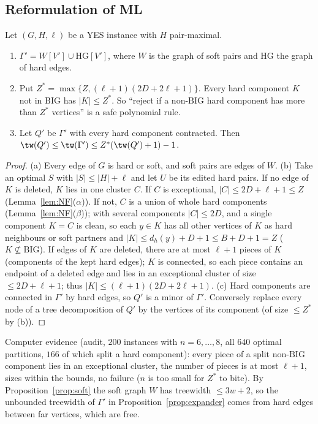 \subsection{Reformulation of ML}
\begin{proposition}\label{prop:one}
Let $(G,H,\ell)$ be a YES instance with $H$ pair-maximal.
\begin{enumerate}
\item[(a)] $\Gamma'=W[V']\cup\mathrm{HG}[V']$, where $W$ is the graph of soft pairs and $\mathrm{HG}$ the graph of hard edges.
\item[(b)] Put $Z^*=\max\{Z,(\ell+1)(2D+2\ell+1)\}$. Every hard component $K$ not in $\mathrm{BIG}$ has $|K|\le Z^*$. So ``reject if a non-$\mathrm{BIG}$ hard component has more than $Z^*$ vertices'' is a safe polynomial rule.
\item[(c)] Let $Q'$ be $\Gamma'$ with every hard component contracted. Then $\tw(Q')\le\tw(\Gamma')\le Z^*(\tw(Q')+1)-1$.
\end{enumerate}
\end{proposition}
\begin{proof}
(a) Every edge of $G$ is hard or soft, and soft pairs are edges of $W$. (b) Take an optimal $S$ with $|S|\le|H|+\ell$ and let $U$ be its edited hard pairs. If no edge of $K$ is deleted, $K$ lies in one cluster $C$. If $C$ is exceptional, $|C|\le2D+\ell+1\le Z$ (Lemma~\ref{lem:NF}($\alpha$)). If not, $C$ is a union of whole hard components (Lemma~\ref{lem:NF}($\beta$)); with several components $|C|\le2D$, and a single component $K=C$ is clean, so each $y\in K$ has all other vertices of $K$ as hard neighbours or soft partners and $|K|\le d_h(y)+D+1\le B+D+1=Z$ ($K\not\subseteq\mathrm{BIG}$). If edges of $K$ are deleted, there are at most $\ell+1$ pieces of $K$ (components of the kept hard edges); $K$ is connected, so each piece contains an endpoint of a deleted edge and lies in an exceptional cluster of size $\le2D+\ell+1$; thus $|K|\le(\ell+1)(2D+2\ell+1)$. (c) Hard components are connected in $\Gamma'$ by hard edges, so $Q'$ is a minor of $\Gamma'$. Conversely replace every node of a tree decomposition of $Q'$ by the vertices of its component (of size $\le Z^*$ by (b)).
\end{proof}
Computer evidence (audit, $200$ instances with $n=6,\dots,8$, all $640$ optimal partitions, $166$ of which split a hard component): every piece of a split non-$\mathrm{BIG}$ component lies in an exceptional cluster, the number of pieces is at most $\ell+1$, sizes within the bounds, no failure ($n$ is too small for $Z^*$ to bite). By Proposition~\ref{prop:soft} the soft graph $W$ has treewidth $\le3w+2$, so the unbounded treewidth of $\Gamma'$ in Proposition~\ref{prop:expander} comes from hard edges between far vertices, which are free.


